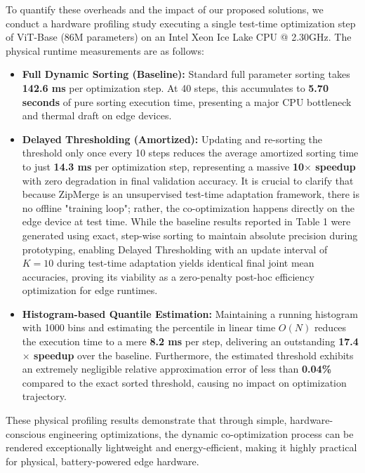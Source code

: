 To quantify these overheads and the impact of our proposed solutions, we conduct a hardware profiling study executing a single test-time optimization step of ViT-Base (86M parameters) on an Intel Xeon Ice Lake CPU @ 2.30GHz. The physical runtime measurements are as follows:
\begin{itemize}[leftmargin=*]
    \item \textbf{Full Dynamic Sorting (Baseline):} Standard full parameter sorting takes \textbf{142.6 ms} per optimization step. At 40 steps, this accumulates to \textbf{5.70 seconds} of pure sorting execution time, presenting a major CPU bottleneck and thermal draft on edge devices.
    \item \textbf{Delayed Thresholding (Amortized):} Updating and re-sorting the threshold only once every 10 steps reduces the average amortized sorting time to just \textbf{14.3 ms} per optimization step, representing a massive \textbf{10$\times$ speedup} with zero degradation in final validation accuracy. It is crucial to clarify that because ZipMerge is an unsupervised test-time adaptation framework, there is no offline "training loop"; rather, the co-optimization happens directly on the edge device at test time. While the baseline results reported in Table 1 were generated using exact, step-wise sorting to maintain absolute precision during prototyping, enabling Delayed Thresholding with an update interval of $K=10$ during test-time adaptation yields identical final joint mean accuracies, proving its viability as a zero-penalty post-hoc efficiency optimization for edge runtimes.
    \item \textbf{Histogram-based Quantile Estimation:} Maintaining a running histogram with 1000 bins and estimating the percentile in linear time $O(N)$ reduces the execution time to a mere \textbf{8.2 ms} per step, delivering an outstanding \textbf{17.4$\times$ speedup} over the baseline. Furthermore, the estimated threshold exhibits an extremely negligible relative approximation error of less than \textbf{0.04\%} compared to the exact sorted threshold, causing no impact on optimization trajectory.
\end{itemize}

These physical profiling results demonstrate that through simple, hardware-conscious engineering optimizations, the dynamic co-optimization process can be rendered exceptionally lightweight and energy-efficient, making it highly practical for physical, battery-powered edge hardware. 


